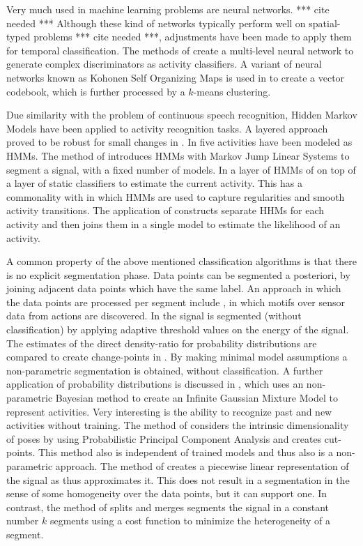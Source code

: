 Very much used in machine learning problems are neural networks. *** cite needed ***
Although these kind of networks typically perform well on spatial-typed problems *** cite needed ***, adjustments have been made to apply them for temporal classification.
The methods of \cite{yang2008using, kwapisz2011activity} create a multi-level neural network to generate complex discriminators as activity classifiers.
A variant of neural networks known as Kohonen Self Organizing Maps is used in \cite{krause2003unsupervised} to create a vector codebook, which is further processed by a $k$-means clustering.

Due similarity with the problem of continuous speech recognition, Hidden Markov Models have been applied to activity recognition tasks.
A layered approach proved to be robust for small changes in \cite{perdikis2008recognition}.
In \cite{shi2009towards} five activities have been modeled as HMMs.
The method of \cite{fox2010bayesian} introduces HMMs with Markov Jump Linear Systems to segment a signal, with a fixed number of models.
In \cite{lester2006practical} a layer of HMMs of on top of a layer of static classifiers to estimate the current activity.
This has a commonality with \cite{lester2005hybrid} in which HMMs are used to capture regularities and smooth activity transitions.
The application of \cite{guenterberg2009distributed} constructs separate HHMs for each activity and then joins them in a single model to estimate the likelihood of an activity.

A common property of the above mentioned classification algorithms is that there is no explicit segmentation phase.
Data points can be segmented a posteriori, by joining adjacent data points which have the same label.
An approach in which the data points are processed per segment include \cite{minnen2006discovering}, in which motifs over sensor data from actions are discovered.
In \cite{guenterberg2009automatic} the signal is segmented (without classification) by applying adaptive threshold values on the energy of the signal.
The estimates of the direct density-ratio for probability distributions are compared to create change-points in \cite{kawahara2009change}.
By making minimal model assumptions a non-parametric segmentation is obtained, without classification.
A further application of probability distributions is discussed in \cite{ahmed2012non}, which uses an non-parametric Bayesian method to create an Infinite Gaussian Mixture Model to represent activities.
Very interesting is the ability to recognize past and new activities without training.
The method of \cite{barbivc2004segmenting} considers the intrinsic dimensionality of poses by using Probabilistic Principal Component Analysis and creates cut-points.
This method also is independent of trained models and thus also is a non-parametric approach.
The method of \cite{keogh2001online} creates a piecewise linear representation of the signal as thus approximates it.
This does not result in a segmentation in the sense of some homogeneity over the data points, but it can support one.
In contrast, the method of \cite{himberg2001time} splits and merges segments the signal in a constant number $k$ segments using a cost function to minimize the heterogeneity of a segment.

